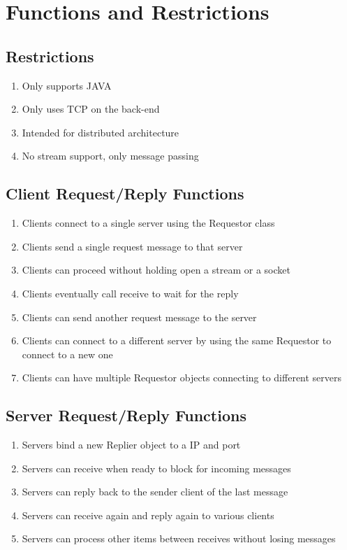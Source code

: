 \documentclass[10pt,journal,compsoc]{IEEEtran}
\begin{document}
\section{Functions and Restrictions}

\subsection{Restrictions}

\begin{enumerate}
\item Only supports JAVA
\item Only uses TCP on the back-end
\item Intended for distributed architecture
\item No stream support, only message passing
\end{enumerate}


\subsection{Client Request/Reply Functions}
\begin{enumerate}
    \item Clients connect to a single server using the Requestor class
    \item Clients send a single request message to that server
    \item Clients can proceed without holding open a stream or a socket
    \item Clients eventually call receive to wait for the reply
    \item Clients can send another request message to the server
    \item Clients can connect to a different server by using the same Requestor to connect to a new one
    \item Clients can have multiple Requestor objects connecting to different servers
\end{enumerate}

\subsection{Server Request/Reply Functions}
\begin{enumerate}
    \item Servers bind a new Replier object to a IP and port
    \item Servers can receive when ready to block for incoming messages
    \item Servers can reply back to the sender client of the last message
    \item Servers can receive again and reply again to various clients
    \item Servers can process other items between receives without losing messages
\end{enumerate}
\end{document}

